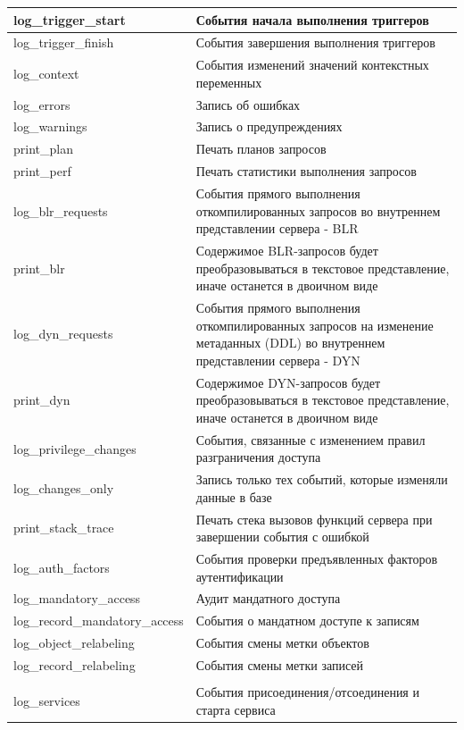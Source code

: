 \begin{longtable}[r]{|>{\ttfamily}m{5cm}|m{10.5cm}|}
	log\_trigger\_start & События начала выполнения триггеров  \\\hline
	log\_trigger\_finish & События завершения выполнения триггеров \\\hline
	log\_context & События изменений значений контекстных переменных   \\\hline
	log\_errors & Запись об ошибках  \\\hline	
	log\_warnings & Запись о предупреждениях   \\\hline
	print\_plan & Печать планов запросов  \\\hline
	print\_perf & Печать статистики выполнения запросов  \\\hline
	log\_blr\_requests &  События прямого выполнения откомпилированных запросов во внутреннем представлении сервера - BLR \\\hline
	print\_blr &  Содержимое BLR-запросов будет преобразовываться в текстовое представление, иначе останется в двоичном виде  \\\hline
	log\_dyn\_requests & События прямого выполнения откомпилированных запросов на изменение метаданных (DDL) во внутреннем представлении сервера - DYN  \\\hline
	print\_dyn & Содержимое DYN-запросов будет преобразовываться в текстовое представление, иначе останется в двоичном виде   \\\hline
	log\_privilege\_changes & События, связанные с изменением правил разграничения доступа  \\\hline
	log\_changes\_only &  Запись только тех событий, которые изменяли данные в базе \\\hline
	print\_stack\_trace & Печать стека вызовов функций сервера при завершении события с ошибкой \\\hline
	log\_auth\_factors & События проверки предъявленных факторов аутентификации \\\hline
	log\_mandatory\_access & Аудит мандатного доступа \\\hline
	log\_record\_mandatory\_access & События о мандатном доступе к записям \\\hline
	log\_object\_relabeling & События смены метки объектов \\\hline
	log\_record\_relabeling & События смены метки записей \\\hline
	\rowcolor[gray]{.9}\multicolumn{2}{|m{15.75cm}|}{\bfseries Services}\\\hline 
	log\_services & События присоединения/отсоединения и старта сервиса \\\hline

\end{longtable}
